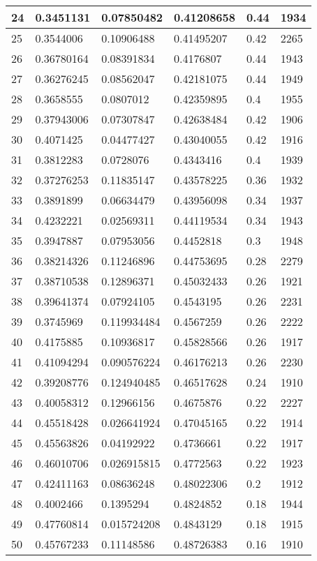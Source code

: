 \begin{longtable}{|l|l|l|l|l|l|}
24 & 0.3451131 & 0.07850482 & 0.41208658 & 0.44 & 1934 \\ \hline 
25 & 0.3544006 & 0.10906488 & 0.41495207 & 0.42 & 2265 \\ \hline 
26 & 0.36780164 & 0.08391834 & 0.4176807 & 0.44 & 1943 \\ \hline 
27 & 0.36276245 & 0.08562047 & 0.42181075 & 0.44 & 1949 \\ \hline 
28 & 0.3658555 & 0.0807012 & 0.42359895 & 0.4 & 1955 \\ \hline 
29 & 0.37943006 & 0.07307847 & 0.42638484 & 0.42 & 1906 \\ \hline 
30 & 0.4071425 & 0.04477427 & 0.43040055 & 0.42 & 1916 \\ \hline 
31 & 0.3812283 & 0.0728076 & 0.4343416 & 0.4 & 1939 \\ \hline 
32 & 0.37276253 & 0.11835147 & 0.43578225 & 0.36 & 1932 \\ \hline 
33 & 0.3891899 & 0.06634479 & 0.43956098 & 0.34 & 1937 \\ \hline 
34 & 0.4232221 & 0.02569311 & 0.44119534 & 0.34 & 1943 \\ \hline 
35 & 0.3947887 & 0.07953056 & 0.4452818 & 0.3 & 1948 \\ \hline 
36 & 0.38214326 & 0.11246896 & 0.44753695 & 0.28 & 2279 \\ \hline 
37 & 0.38710538 & 0.12896371 & 0.45032433 & 0.26 & 1921 \\ \hline 
38 & 0.39641374 & 0.07924105 & 0.4543195 & 0.26 & 2231 \\ \hline 
39 & 0.3745969 & 0.119934484 & 0.4567259 & 0.26 & 2222 \\ \hline 
40 & 0.4175885 & 0.10936817 & 0.45828566 & 0.26 & 1917 \\ \hline 
41 & 0.41094294 & 0.090576224 & 0.46176213 & 0.26 & 2230 \\ \hline 
42 & 0.39208776 & 0.124940485 & 0.46517628 & 0.24 & 1910 \\ \hline 
43 & 0.40058312 & 0.12966156 & 0.4675876 & 0.22 & 2227 \\ \hline 
44 & 0.45518428 & 0.026641924 & 0.47045165 & 0.22 & 1914 \\ \hline 
45 & 0.45563826 & 0.04192922 & 0.4736661 & 0.22 & 1917 \\ \hline 
46 & 0.46010706 & 0.026915815 & 0.4772563 & 0.22 & 1923 \\ \hline 
47 & 0.42411163 & 0.08636248 & 0.48022306 & 0.2 & 1912 \\ \hline 
48 & 0.4002466 & 0.1395294 & 0.4824852 & 0.18 & 1944 \\ \hline 
49 & 0.47760814 & 0.015724208 & 0.4843129 & 0.18 & 1915 \\ \hline 
50 & 0.45767233 & 0.11148586 & 0.48726383 & 0.16 & 1910 \\ \hline 
\end{longtable}